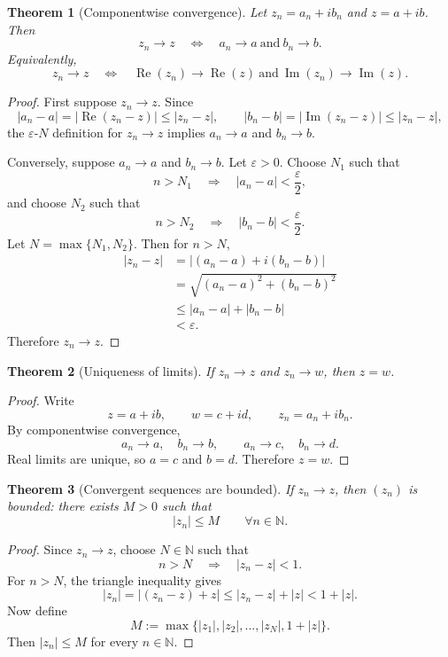 \documentclass[11pt]{article}
\newtheorem{theorem}{Theorem}[section]
\newcommand{\N}{\mathbb{N}}
\newcommand{\abs}[1]{\left|#1\right|}
\newcommand{\Real}{\operatorname{Re}}
\newcommand{\Imag}{\operatorname{Im}}
\begin{document}
\begin{theorem}[Componentwise convergence]
Let $z_{n}=a_{n}+ib_{n}$ and $z=a+ib$.
Then
\[
  z_{n}\to z
  \quad\Longleftrightarrow\quad
  a_{n}\to a\ \text{and}\ b_{n}\to b.
\]
Equivalently,
\[
  z_{n}\to z
  \quad\Longleftrightarrow\quad
  \Real(z_{n})\to\Real(z)\ \text{and}\ \Imag(z_{n})\to\Imag(z).
\]
\end{theorem}

\begin{proof}
First suppose $z_{n}\to z$.
Since
\[
  \abs{a_{n}-a}=\abs{\Real(z_{n}-z)}\le \abs{z_{n}-z},
  \qquad
  \abs{b_{n}-b}=\abs{\Imag(z_{n}-z)}\le \abs{z_{n}-z},
\]
the $\varepsilon$-$N$ definition for $z_{n}\to z$ implies $a_{n}\to a$ and $b_{n}\to b$.

Conversely, suppose $a_{n}\to a$ and $b_{n}\to b$.
Let $\varepsilon>0$.
Choose $N_{1}$ such that
\[
  n>N_{1}\quad\Longrightarrow\quad \abs{a_{n}-a}<\frac{\varepsilon}{2},
\]
and choose $N_{2}$ such that
\[
  n>N_{2}\quad\Longrightarrow\quad \abs{b_{n}-b}<\frac{\varepsilon}{2}.
\]
Let $N=\max\{N_{1},N_{2}\}$.
Then for $n>N$,
\[
\begin{aligned}
  \abs{z_{n}-z}
    &=\abs{(a_{n}-a)+i(b_{n}-b)} \\
    &=\sqrt{(a_{n}-a)^{2}+(b_{n}-b)^{2}} \\
    &\le \abs{a_{n}-a}+\abs{b_{n}-b} \\
    &<\varepsilon.
\end{aligned}
\]
Therefore $z_{n}\to z$.
\end{proof}

\begin{theorem}[Uniqueness of limits]
If $z_{n}\to z$ and $z_{n}\to w$, then $z=w$.
\end{theorem}

\begin{proof}
Write
\[
  z=a+ib,
  \qquad
  w=c+id,
  \qquad
  z_{n}=a_{n}+ib_{n}.
\]
By componentwise convergence,
\[
  a_{n}\to a,\quad b_{n}\to b,
  \qquad
  a_{n}\to c,\quad b_{n}\to d.
\]
Real limits are unique, so $a=c$ and $b=d$.
Therefore $z=w$.
\end{proof}

\begin{theorem}[Convergent sequences are bounded]
If $z_{n}\to z$, then $(z_{n})$ is bounded: there exists $M>0$ such that
\[
  \abs{z_{n}}\le M
  \qquad
  \forall n\in\N.
\]
\end{theorem}

\begin{proof}
Since $z_{n}\to z$, choose $N\in\N$ such that
\[
  n>N\quad\Longrightarrow\quad \abs{z_{n}-z}<1.
\]
For $n>N$, the triangle inequality gives
\[
  \abs{z_{n}}
  =\abs{(z_{n}-z)+z}
  \le \abs{z_{n}-z}+\abs{z}
  <1+\abs{z}.
\]
Now define
\[
  M:=\max\{\abs{z_{1}},\abs{z_{2}},\dots,\abs{z_{N}},1+\abs{z}\}.
\]
Then $\abs{z_{n}}\le M$ for every $n\in\N$.
\end{proof}
\end{document}
